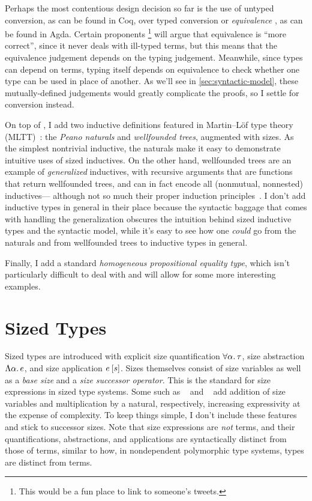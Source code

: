 Perhaps the most contentious design decision so far is the use of untyped conversion,
as can be found in Coq, over typed conversion or \emph{equivalence}%
,
as can be found in Agda.
Certain proponents%
\footnote{This would be a fun place to link to someone's tweets.}
will argue that equivalence is ``more correct'',
since it never deals with ill-typed terms,
but this means that the equivalence judgement depends on the typing judgement.
Meanwhile, since types can depend on terms,
typing itself depends on equivalence to check whether one type can be used in place of another.
As we'll see in \cref{sec:syntactic-model}, these mutually-defined judgements would greatly complicate the proofs,
so I settle for conversion instead.

On top of \GCC, I add two inductive definitions featured in Martin--L\"of type theory (MLTT)~\citep{mltt}:
the \emph{Peano naturals} and \emph{wellfounded trees}, augmented with sizes.
As the simplest nontrivial inductive,
the naturals make it easy to demonstrate intuitive uses of sized inductives.
On the other hand, wellfounded trees are an example of \emph{generalized} inductives,
with recursive arguments that are functions that return wellfounded trees,
and can in fact encode all (nonmutual, nonnested) inductives---%
although not so much their proper induction principles~\citep{W-types}.
I don't add inductive types in general in their place
because the syntactic baggage that comes with handling the generalization
obscures the intuition behind sized inductive types and the syntactic model,
while it's easy to see how one \emph{could} go from the naturals and from wellfounded trees
to inductive types in general.

Finally, I add a standard \emph{homogeneous propositional equality type},
which isn't particularly difficult to deal with
and will allow for some more interesting examples.

\section{Sized Types}

Sized types are introduced with explicit size quantification $\forall \alpha \mathpunct{.} \tau$,
size abstraction $\Lambda \alpha \mathpunct{.} e$, and size application $\App{e}{s}$.
Sizes themselves consist of size variables as well as a \emph{base size}
and a \emph{size successor operator}.
This is the standard for size expressions in sized type systems.
Some such as \Fhattimes~\citep{F-hat-times} and \CIChatl~\citep{CIC-hat-l}
add addition of size variables and multiplication by a natural, respectively,
increasing expressivity at the expense of complexity.
To keep things simple, I don't include these features and stick to successor sizes.
Note that size expressions are \emph{not} terms,
and their quantifications, abstractions, and applications
are syntactically distinct from those of terms,
similar to how, in nondependent polymorphic type systems,
types are distinct from terms.

